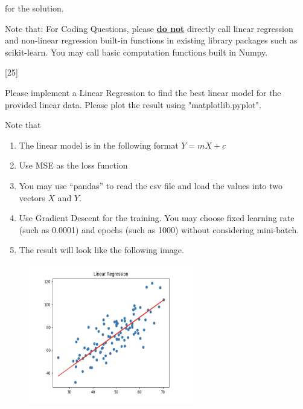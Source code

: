 \documentclass[12pt,letterpaper, onecolumn]{exam}
\begin{document}
\begin{questions}
\begin{solution}
        for the solution.
    \end{solution}

    \pagebreak

    Note that: For Coding Questions, please \textbf{\underline{do not}} directly call linear regression and non-linear 
    regression built-in functions in existing library packages such as scikit-learn. You may call basic 
    computation functions built in Numpy.

    [25]

    Please implement a Linear Regression to find the best linear model for the provided
    linear data. Please plot the result using "matplotlib.pyplot".

    Note that

    \begin{enumerate}[label=(\arabic*)]
        \item The linear model is in the following format $Y=mX+c$
        \item Use MSE as the loss function
        \item You may use “pandas” to read the csv file and load the values into two vectors $X$ and $Y$.
        \item Use Gradient Descent for the training. You may choose fixed learning rate (such as
        0.0001) and epochs (such as 1000) without considering mini-batch.
        \item The result will look like the following image.
    \end{enumerate}

    \begin{figure}[h]
        \centering
        \includegraphics[width=0.64\textwidth]{linear.png}
    \end{figure}

    \begin{solution}


\end{solution}
\end{questions}
\end{document}
